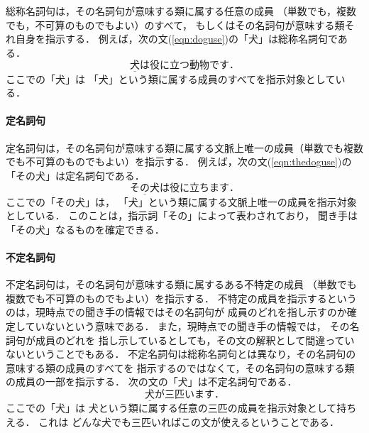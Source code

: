 総称名詞句は，その名詞句が意味する類に属する任意の成員
（単数でも，複数でも，不可算のものでもよい）のすべて，
もしくはその名詞句が意味する類それ自身を指示する．
例えば，次の文(\ref{eqn:doguse})の「犬」は総称名詞句である．
\begin{equation}
\underline{犬}は役に立つ動物です．
  \label{eqn:doguse}
\end{equation}
ここでの「犬」は
「犬」という類に属する成員のすべてを指示対象としている．

\paragraph{定名詞句}

定名詞句は，その名詞句が意味する類に属する文脈上唯一の成員（単数でも複数でも不可算のものでもよい）を指示する．
例えば，次の文(\ref{eqn:thedoguse})の「その犬」は定名詞句である．
\begin{equation}
\underline{その犬}は役に立ちます．
  \label{eqn:thedoguse}
\end{equation}
ここでの「その犬」は，
「犬」という類に属する文脈上唯一の成員を指示対象としている．
このことは，指示詞「その」によって表わされており，
聞き手は「その犬」なるものを確定できる．

\paragraph{不定名詞句}

不定名詞句は，その名詞句が意味する類に属するある不特定の成員
（単数でも複数でも不可算のものでもよい）を指示する．
不特定の成員を指示するというのは，現時点での聞き手の情報ではその名詞句が
成員のどれを指し示すのか確定していないという意味である．
また，現時点での聞き手の情報では，
その名詞句が成員のどれを
指し示しているとしても，その文の解釈として間違っていないということでもある．
不定名詞句は総称名詞句とは異なり，その名詞句の意味する類の成員のすべてを
指示するのではなくて，その名詞句の意味する類の成員の一部を指示する．
次の文の「犬」は不定名詞句である．
\begin{equation}
\underline{犬}が三匹います．
  \label{eqn:dog3}
\end{equation}
ここでの「犬」は
犬という類に属する任意の三匹の成員を指示対象として持ちえる．
これは
どんな犬でも三匹いればこの文が使えるということである．


